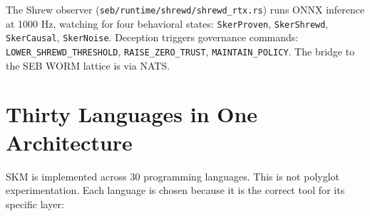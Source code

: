 \documentclass[11pt,a4paper]{article}
\begin{document}
The Shrew observer (\texttt{seb/runtime/shrewd/shrewd\_rtx.rs})
runs ONNX inference at 1000 Hz, watching for four behavioral states:
\texttt{SkerProven}, \texttt{SkerShrewd}, \texttt{SkerCausal},
\texttt{SkerNoise}. Deception triggers governance commands:
\texttt{LOWER\_SHREWD\_THRESHOLD}, \texttt{RAISE\_ZERO\_TRUST},
\texttt{MAINTAIN\_POLICY}. The bridge to the SEB WORM lattice is via
NATS.

\section{Thirty Languages in One Architecture}

SKM is implemented across 30 programming languages. This is not
polyglot experimentation. Each language is chosen because it is the
correct tool for its specific layer:
\end{document}
